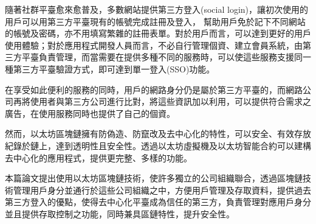 \begin{abstractzh}

    隨著社群平臺愈來愈普及，多數網站提供第三方登入(social login)，讓初次使用的用戶可以用第三方平臺現有的帳號完成註冊及登入，
    幫助用戶免於記下不同網站的帳號及密碼，亦不用填寫繁雜的註冊表單。對於用戶而言，可以達到更好的用戶使用體驗；對於應用程式開發人員而言，不必自行管理個資、建立會員系統，由第三方平臺負責管理，而當需要在提供多種不同的服務時，可以使這些服務支援同一種第三方平臺驗證方式，即可達到單一登入(SSO)功能。\par
    在享受如此便利的服務的同時，用戶的網路身分仍是屬於第三方平臺的，而網路公司再將使用者與第三方公司進行比對，將這些資訊加以利用，可以提供符合需求之廣告，在使用服務同時也提供了自己的個資。\par
    然而，以太坊區塊鏈擁有防偽造、防竄改及去中心化的特性，可以安全、有效存放紀錄於鏈上，達到透明性且安全性。透過以太坊虛擬機及以太坊智能合約可以建構去中心化的應用程式，提供更完整、多樣的功能。\par
    本篇論文提出使用以太坊區塊鏈技術，使許多獨立的公司組織聯合，透過區塊鏈技術管理用戶身分並通行於這些公司組織之中，方便用戶管理及存取資料，提供過去第三方登入的優點，使得去中心化平臺成為信任的第三方，負責管理對應用戶身分並且提供存取控制之功能，同時兼具區鏈特性，提升安全性。

\end{abstractzh}